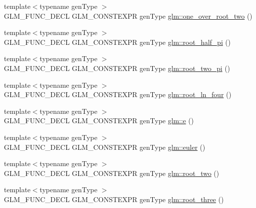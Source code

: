\begin{DoxyCompactItemize}
\item 
{\footnotesize template$<$typename gen\+Type $>$ }\\G\+L\+M\+\_\+\+F\+U\+N\+C\+\_\+\+D\+E\+CL G\+L\+M\+\_\+\+C\+O\+N\+S\+T\+E\+X\+PR gen\+Type \hyperlink{group__gtc__constants_ga788fa23a0939bac4d1d0205fb4f35818}{glm\+::one\+\_\+over\+\_\+root\+\_\+two} ()
\item 
{\footnotesize template$<$typename gen\+Type $>$ }\\G\+L\+M\+\_\+\+F\+U\+N\+C\+\_\+\+D\+E\+CL G\+L\+M\+\_\+\+C\+O\+N\+S\+T\+E\+X\+PR gen\+Type \hyperlink{group__gtc__constants_ga4e276cb823cc5e612d4f89ed99c75039}{glm\+::root\+\_\+half\+\_\+pi} ()
\item 
{\footnotesize template$<$typename gen\+Type $>$ }\\G\+L\+M\+\_\+\+F\+U\+N\+C\+\_\+\+D\+E\+CL G\+L\+M\+\_\+\+C\+O\+N\+S\+T\+E\+X\+PR gen\+Type \hyperlink{group__gtc__constants_ga2bcedc575039fe0cd765742f8bbb0bd3}{glm\+::root\+\_\+two\+\_\+pi} ()
\item 
{\footnotesize template$<$typename gen\+Type $>$ }\\G\+L\+M\+\_\+\+F\+U\+N\+C\+\_\+\+D\+E\+CL G\+L\+M\+\_\+\+C\+O\+N\+S\+T\+E\+X\+PR gen\+Type \hyperlink{group__gtc__constants_ga4129412e96b33707a77c1a07652e23e2}{glm\+::root\+\_\+ln\+\_\+four} ()
\item 
{\footnotesize template$<$typename gen\+Type $>$ }\\G\+L\+M\+\_\+\+F\+U\+N\+C\+\_\+\+D\+E\+CL G\+L\+M\+\_\+\+C\+O\+N\+S\+T\+E\+X\+PR gen\+Type \hyperlink{group__gtc__constants_ga4b7956eb6e2fbedfc7cf2e46e85c5139}{glm\+::e} ()
\item 
{\footnotesize template$<$typename gen\+Type $>$ }\\G\+L\+M\+\_\+\+F\+U\+N\+C\+\_\+\+D\+E\+CL G\+L\+M\+\_\+\+C\+O\+N\+S\+T\+E\+X\+PR gen\+Type \hyperlink{group__gtc__constants_gad8fe2e6f90bce9d829e9723b649fbd42}{glm\+::euler} ()
\item 
{\footnotesize template$<$typename gen\+Type $>$ }\\G\+L\+M\+\_\+\+F\+U\+N\+C\+\_\+\+D\+E\+CL G\+L\+M\+\_\+\+C\+O\+N\+S\+T\+E\+X\+PR gen\+Type \hyperlink{group__gtc__constants_ga74e607d29020f100c0d0dc46ce2ca950}{glm\+::root\+\_\+two} ()
\item 
{\footnotesize template$<$typename gen\+Type $>$ }\\G\+L\+M\+\_\+\+F\+U\+N\+C\+\_\+\+D\+E\+CL G\+L\+M\+\_\+\+C\+O\+N\+S\+T\+E\+X\+PR gen\+Type \hyperlink{group__gtc__constants_ga4f286be4abe88be1eed7d2a9f6cb193e}{glm\+::root\+\_\+three} ()

\end{DoxyCompactItemize}
